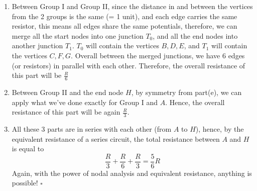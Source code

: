 \begin{enumerate}
{\begin{enumerate}
        \item Between Group I and Group II, since the distance in and between the vertices from the 2 groups is the same (= 1 unit), and each edge carries the same resistor, this means all edges share the same potentials, therefore, we can merge all the start nodes into one junction $T_0$, and all the end nodes into another junction $T_1$. $T_0$ will contain the vertices $B, D, E$, and $T_1$ will contain the vertices $C, F, G$. Overall between the merged junctions, we have 6 edges (or resistors) in parallel with each other. Therefore, the overall resistance of this part will be $\frac{R}{6}$
        \item Between Group II and the end node $H$, by symmetry from part(e), we can apply what we've done exactly for Group I and $A$. Hence, the overall resistance of this part will be again $\frac{R}{3}$.
        \item All these 3 parts are in series with each other (from $A$ to $H$), hence, by the equivalent resistance of a series circuit, the total resistance between $A$ and $H$ is equal to 
        $$ \frac{R}{3} + \frac{R}{6} + \frac{R}{3} = \frac{5}{6}R$$
        Again, with the power of nodal analysis and equivalent resistance, anything is possible! $\square$
    \end{enumerate}
    }
\end{enumerate}